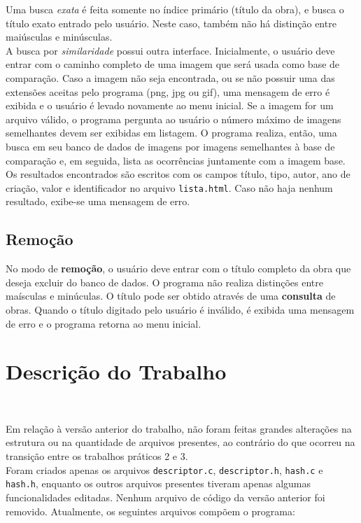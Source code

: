 \documentclass{article}
\begin{document}
Uma busca \textit{exata} é feita somente no índice primário (título da obra), e busca o título exato entrado pelo usuário. Neste caso, também não há distinção entre maiúsculas e minúsculas.\\

A busca por \textit{similaridade} possui outra interface. Inicialmente, o usuário deve entrar com o caminho completo de uma imagem que será usada como base de comparação. Caso a imagem não seja encontrada, ou se não possuir uma das extensões aceitas pelo programa (png, jpg ou gif), uma mensagem de erro é exibida e o usuário é levado novamente ao menu inicial. Se a imagem for um arquivo válido, o programa pergunta ao usuário o número máximo de imagens semelhantes devem ser exibidas em listagem. O programa realiza, então, uma busca em seu banco de dados de imagens por imagens semelhantes à base de comparação e, em seguida, lista as ocorrências juntamente com a imagem base.\\

Os resultados encontrados são escritos com os campos título, tipo, autor, ano de criação, valor e identificador no arquivo \texttt{lista.html}. Caso não haja nenhum resultado, exibe-se uma mensagem de erro.

\subsection{Remoção}

No modo de \textbf{remoção}, o usuário deve entrar com o título completo da obra que deseja excluir do banco de dados. O programa não realiza distinções entre maísculas e minúculas. O título pode ser obtido através de uma \textbf{consulta} de obras. Quando o título digitado pelo usuário é inválido, é exibida uma mensagem de erro e o programa retorna ao menu inicial.

\section{Descrição do Trabalho}\

Em relação à versão anterior do trabalho, não foram feitas grandes alterações na estrutura ou na quantidade de arquivos presentes, ao contrário do que ocorreu na transição entre os trabalhos práticos 2 e 3.\\

Foram criados apenas os arquivos \texttt{descriptor.c}, \texttt{descriptor.h}, \texttt{hash.c} e \texttt{hash.h}, enquanto os outros arquivos presentes tiveram apenas algumas funcionalidades editadas. Nenhum arquivo de código da versão anterior foi removido. Atualmente, os seguintes arquivos compõem o programa:
\end{document}

